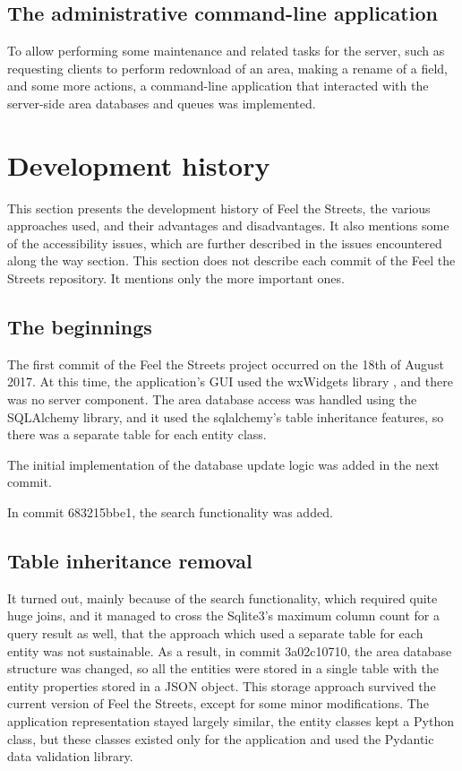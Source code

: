 \documentclass[nolof,digital]{fithesis3}
\begin{document}
\subsection{The administrative command-line application}
To allow performing some maintenance and related tasks for the server, such as requesting clients to perform redownload of an area, making a rename of a field, and some more actions, a command-line application that interacted with the server-side area databases and queues was implemented.
\section{Development history} \label{ref:devhistory}
This section presents the development history of Feel the Streets, the various approaches used, and their advantages and disadvantages. It also mentions some of the accessibility issues, which are further described in the issues encountered along the way section. This section does not describe each commit of the Feel the Streets repository. It mentions only the more important ones.
\subsection{The beginnings}
The first commit of the Feel the Streets project occurred on the 18th of August 2017. At this time, the application's GUI used the wxWidgets library \parencite{wx}, and there was no server component. The area database access was handled using the SQLAlchemy library, and it used the sqlalchemy's table inheritance features, so there was a separate table for each entity class.

The initial implementation of the database update logic was added in the next commit.

In commit 683215bbe1, the search functionality was added.
\subsection{Table inheritance removal}
It turned out, mainly because of the search functionality, which required quite huge joins, and it managed to cross the Sqlite3's maximum column count for a query result as well, that the approach which used a separate table for each entity was not sustainable. As a result, in commit 3a02c10710, the area database structure was changed, so all the entities were stored in a single table with the entity properties stored in a JSON object. This storage approach survived the current version of Feel the Streets, except for some minor modifications. The application representation stayed largely similar, the entity classes kept a Python class, but these classes existed only for the application and used the Pydantic data validation library.
\end{document}

